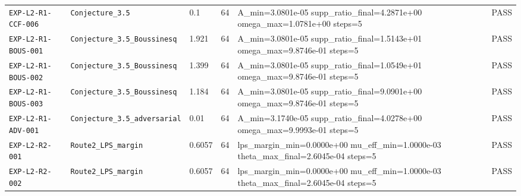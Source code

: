 {\begin{longtable}{@{}>{\raggedright\arraybackslash}p{} >{\raggedright\arraybackslash}p{} l l >{\raggedright\arraybackslash}p{} l@{}}
\texttt{EXP-\allowbreak{}L2-\allowbreak{}R1-\allowbreak{}CCF-\allowbreak{}006} & \texttt{Conjecture\_\allowbreak{}3.5} & 0.1 & 64 & A\_\allowbreak{}min=\allowbreak{}3.0801e-05  supp\_\allowbreak{}ratio\_\allowbreak{}final=\allowbreak{}4.2871e+00  omega\_\allowbreak{}max=\allowbreak{}1.0781e+00  steps=\allowbreak{}5 & \textsf{PASS}\\
\texttt{EXP-\allowbreak{}L2-\allowbreak{}R1-\allowbreak{}BOUS-\allowbreak{}001} & \texttt{Conjecture\_\allowbreak{}3.5\_\allowbreak{}Boussinesq} & 1.921 & 64 & A\_\allowbreak{}min=\allowbreak{}3.0801e-05  supp\_\allowbreak{}ratio\_\allowbreak{}final=\allowbreak{}1.5143e+01  omega\_\allowbreak{}max=\allowbreak{}9.8746e-01  steps=\allowbreak{}5 & \textsf{PASS}\\
\texttt{EXP-\allowbreak{}L2-\allowbreak{}R1-\allowbreak{}BOUS-\allowbreak{}002} & \texttt{Conjecture\_\allowbreak{}3.5\_\allowbreak{}Boussinesq} & 1.399 & 64 & A\_\allowbreak{}min=\allowbreak{}3.0801e-05  supp\_\allowbreak{}ratio\_\allowbreak{}final=\allowbreak{}1.0549e+01  omega\_\allowbreak{}max=\allowbreak{}9.8746e-01  steps=\allowbreak{}5 & \textsf{PASS}\\
\texttt{EXP-\allowbreak{}L2-\allowbreak{}R1-\allowbreak{}BOUS-\allowbreak{}003} & \texttt{Conjecture\_\allowbreak{}3.5\_\allowbreak{}Boussinesq} & 1.184 & 64 & A\_\allowbreak{}min=\allowbreak{}3.0801e-05  supp\_\allowbreak{}ratio\_\allowbreak{}final=\allowbreak{}9.0901e+00  omega\_\allowbreak{}max=\allowbreak{}9.8746e-01  steps=\allowbreak{}5 & \textsf{PASS}\\
\texttt{EXP-\allowbreak{}L2-\allowbreak{}R1-\allowbreak{}ADV-\allowbreak{}001} & \texttt{Conjecture\_\allowbreak{}3.5\_\allowbreak{}adversarial} & 0.01 & 64 & A\_\allowbreak{}min=\allowbreak{}3.1740e-05  supp\_\allowbreak{}ratio\_\allowbreak{}final=\allowbreak{}4.0278e+00  omega\_\allowbreak{}max=\allowbreak{}9.9993e-01  steps=\allowbreak{}5 & \textsf{PASS}\\
\texttt{EXP-\allowbreak{}L2-\allowbreak{}R2-\allowbreak{}001} & \texttt{Route2\_\allowbreak{}LPS\_\allowbreak{}margin} & 0.6057 & 64 & lps\_\allowbreak{}margin\_\allowbreak{}min=\allowbreak{}0.0000e+00  mu\_\allowbreak{}eff\_\allowbreak{}min=\allowbreak{}1.0000e-03  theta\_\allowbreak{}max\_\allowbreak{}final=\allowbreak{}2.6045e-04  steps=\allowbreak{}5 & \textsf{PASS}\\
\texttt{EXP-\allowbreak{}L2-\allowbreak{}R2-\allowbreak{}002} & \texttt{Route2\_\allowbreak{}LPS\_\allowbreak{}margin} & 0.6057 & 64 & lps\_\allowbreak{}margin\_\allowbreak{}min=\allowbreak{}0.0000e+00  mu\_\allowbreak{}eff\_\allowbreak{}min=\allowbreak{}1.0000e-03  theta\_\allowbreak{}max\_\allowbreak{}final=\allowbreak{}2.6045e-04  steps=\allowbreak{}5 & \textsf{PASS}\\

\end{longtable}}
